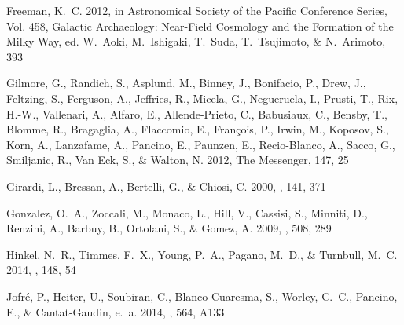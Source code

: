 \documentclass[12pt, preprint]{aastex}
\begin{document}
\begin{thebibliography}{23}
{Freeman}, K.~C. 2012, in Astronomical Society of the Pacific Conference
  Series, Vol. 458, Galactic Archaeology: Near-Field Cosmology and the
  Formation of the Milky Way, ed. W.~{Aoki}, M.~{Ishigaki}, T.~{Suda},
  T.~{Tsujimoto}, \& N.~{Arimoto}, 393

{Gilmore}, G., {Randich}, S., {Asplund}, M., {Binney}, J., {Bonifacio}, P.,
  {Drew}, J., {Feltzing}, S., {Ferguson}, A., {Jeffries}, R., {Micela}, G.,
  {Negueruela}, I., {Prusti}, T., {Rix}, H.-W., {Vallenari}, A., {Alfaro}, E.,
  {Allende-Prieto}, C., {Babusiaux}, C., {Bensby}, T., {Blomme}, R.,
  {Bragaglia}, A., {Flaccomio}, E., {Fran{\c c}ois}, P., {Irwin}, M.,
  {Koposov}, S., {Korn}, A., {Lanzafame}, A., {Pancino}, E., {Paunzen}, E.,
  {Recio-Blanco}, A., {Sacco}, G., {Smiljanic}, R., {Van Eck}, S., \& {Walton},
  N. 2012, The Messenger, 147, 25

{Girardi}, L., {Bressan}, A., {Bertelli}, G., \& {Chiosi}, C. 2000, \aaps, 141,
  371

{Gonzalez}, O.~A., {Zoccali}, M., {Monaco}, L., {Hill}, V., {Cassisi}, S.,
  {Minniti}, D., {Renzini}, A., {Barbuy}, B., {Ortolani}, S., \& {Gomez}, A.
  2009, \aap, 508, 289

{Hinkel}, N.~R., {Timmes}, F.~X., {Young}, P.~A., {Pagano}, M.~D., \&
  {Turnbull}, M.~C. 2014, \aj, 148, 54

{Jofr{\'e}}, P., {Heiter}, U., {Soubiran}, C., {Blanco-Cuaresma}, S., {Worley},
  C.~C., {Pancino}, E., \& {Cantat-Gaudin}, e.~a. 2014, \aap, 564, A133


\end{thebibliography}
\end{document}
